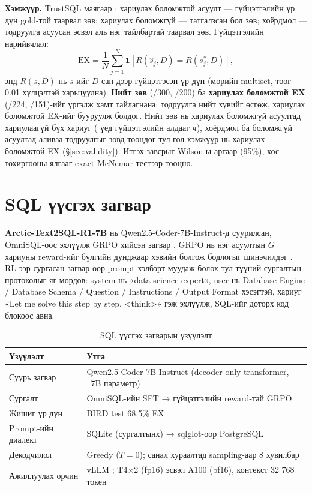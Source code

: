 \textbf{Хэмжүүр.} TrustSQL маягаар \cite{lee_2024_trustsql}: хариулах боломжтой асуулт --- гүйцэтгэлийн үр дүн gold-той
таарвал зөв; хариулах боломжгүй --- татгалзсан бол зөв; хоёрдмол --- тодруулга асуусан эсвэл аль нэг тайлбартай таарвал
зөв. Гүйцэтгэлийн нарийвчлал:
\begin{equation}
\mathrm{EX} = \frac{1}{N}\sum_{j=1}^{N} \mathbf{1}\!\left[R(\hat{s}_j, D) = R(s^{\ast}_j, D)\right],
\label{eq:ex}
\end{equation}
энд $R(s, D)$ нь $s$-ийг $D$ сан дээр гүйцэтгэсэн үр дүн (мөрийн multiset, тоог 0.01 хүлцэлтэй харьцуулна). \textbf{Нийт
зөв} (/300, /200) ба \textbf{хариулах боломжтой EX} (/224, /151)-ийг үргэлж хамт тайлагнана: тодруулга нийт хувийг өсгөж,
хариулах боломжтой EX-ийг бууруулж болдог. Нийт зөв нь хариулах боломжгүй асуултад хариулаагүй бүх хариуг
( үед гүйцэтгэлийн алдааг ч), хоёрдмол ба боломжгүй асуултад аливаа тодруулгыг зөвд тооцдог тул
гол хэмжүүр нь хариулах боломжтой EX (§\ref{sec:validity}). Итгэх завсрыг Wilson-ы аргаар (95\%), хос тохиргооны ялгааг
exact McNemar тестээр \cite{mcnemar_1947} тооцно.

\section{SQL үүсгэх загвар}
\label{sec:sql-model}

\textbf{Arctic-Text2SQL-R1-7B} нь Qwen2.5-Coder-7B-Instruct-д \cite{hui_2024_qwen25_coder} суурилсан, OmniSQL-оос
эхлүүлж GRPO хийсэн загвар \cite{yao_2025_arctic_text2sql_r1, snowflake_2025_arctic_card}. GRPO нь нэг асуултын $G$
хариуны reward-ийг бүлгийн дунджаар хэвийн болгож бодлогыг шинэчилдэг \cite{shao_2024_deepseekmath}. RL-ээр сургасан
загвар өөр prompt хэлбэрт муудаж болох тул түүний сургалтын протоколыг яг мөрдөв: system нь «data science expert», user нь
Database Engine / Database Schema / Question / Instructions / Output Format хэсэгтэй, хариуг «Let me solve this step by
step. <think>» гэж эхлүүлж, SQL-ийг  доторх код блокоос авна.

\begin{table}[H]
\centering\small
\caption{SQL үүсгэх загварын үзүүлэлт}
\label{tab:arctic}
\begin{tabularx}{\textwidth}{p{4.2cm}X}
\toprule
Үзүүлэлт & Утга \\
\midrule
Суурь загвар & Qwen2.5-Coder-7B-Instruct (decoder-only transformer, ~7B параметр) \\
Сургалт & OmniSQL-ийн SFT → гүйцэтгэлийн reward-тай GRPO \\
Жишиг үр дүн & BIRD test 68.5\% EX \cite{yao_2025_arctic_text2sql_r1} \\
Prompt-ийн диалект & SQLite (сургалтынх) → sqlglot-оор PostgreSQL \cite{mao_2026_sqlglot} \\
Декодчилол & Greedy ($T = 0$); санал хураалтад sampling-аар 8 хувилбар \\
Ажиллуулах орчин & vLLM \cite{kwon_2023_vllm}; T4×2 (fp16) эсвэл A100 (bf16), контекст 32 768 токен \\
\bottomrule
\end{tabularx}
\end{table}


